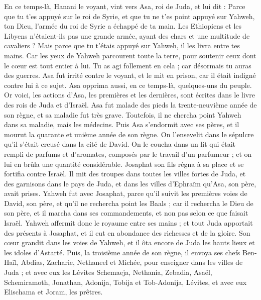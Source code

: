 \begin{multicols}{2}
En ce temps-là, Hanani le voyant, vint vers Asa, roi de Juda, et lui dit : Parce que tu t'es appuyé sur le roi de Syrie, et que tu ne t'es point appuyé sur Yahweh, ton Dieu, l'armée du roi de Syrie a échappé de ta main.
Les Ethiopiens et les Libyens n'étaient-ils pas une grande armée, ayant des chars et une multitude de cavaliers ? Mais parce que tu t'étais appuyé sur Yahweh, il les livra entre tes mains.
Car les yeux de Yahweh parcourent toute la terre, pour soutenir ceux dont le cœur est tout entier à lui. Tu as agi follement en cela ; car désormais tu auras des guerres.
Asa fut irrité contre le voyant, et le mit en prison, car il était indigné contre lui à ce sujet. Asa opprima aussi, en ce temps-là, quelques-uns du peuple.
Or voici, les actions d'Asa, les premières et les dernières, sont écrites dans le livre des rois de Juda et d'Israël.
Asa fut malade des pieds la trente-neuvième année de son règne, et sa maladie fut très grave. Toutefois, il ne chercha point Yahweh dans sa maladie, mais les médecins.
Puis Asa s'endormit avec ses pères, et il mourut la quarante et unième année de son règne.
On l'ensevelit dans le sépulcre qu'il s'était creusé dans la cité de David. On le coucha dans un lit qui était rempli de parfums et d'aromates, composés par le travail d'un parfumeur ; et on lui en brûla une quantité considérable.
\VerseOne{}Josaphat son fils régna à sa place et se fortifia contre Israël.
Il mit des troupes dans toutes les villes fortes de Juda, et des garnisons dans le pays de Juda, et dans les villes d'Ephraïm qu'Asa, son père, avait prises.
Yahweh fut avec Josaphat, parce qu'il suivit les premières voies de David, son père, et qu'il ne rechercha point les Baals ;
car il rechercha le Dieu de son père, et il marcha dans ses commandements, et non pas selon ce que faisait Israël.
Yahweh affermit donc le royaume entre ses mains ; et tout Juda apportait des présents à Josaphat, et il eut en abondance des richesses et de la gloire.
Son cœur grandit dans les voies de Yahweh, et il ôta encore de Juda les hauts lieux et les idoles d'Astarté.
Puis, la troisième année de son règne, il envoya ses chefs Ben-Haïl, Abdias, Zacharie, Nethaneel et Michée, pour enseigner dans les villes de Juda ;
et avec eux les Lévites Schemaeja, Nethania, Zebadia, Asaël, Schemiramoth, Jonathan, Adonija, Tobija et Tob-Adonija, Lévites, et avec eux Elischama et Joram, les prêtres.

\end{multicols}
